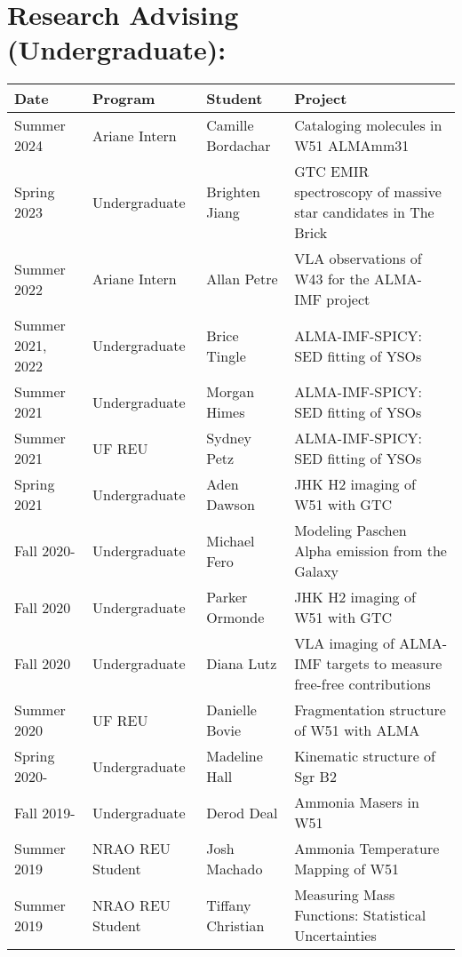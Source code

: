 \begin{minipage}{\textwidth}
\section*{Research Advising (Undergraduate): }
\vspace{-12pt}
\begin{tabular}{p{0.85in}p{1.3in}lp{2.6in}}
    Date  & Program & Student &  Project \\
    \hline
    Summer 2024 & Ariane Intern &          Camille Bordachar &  Cataloging molecules in W51 ALMAmm31 \\
    Spring 2023 & Undergraduate &          Brighten Jiang    &  GTC EMIR spectroscopy of massive star candidates in The Brick \\
    Summer 2022 & Ariane Intern &          Allan Petre    &  VLA observations of W43 for the ALMA-IMF project \\
    Summer 2021, 2022 & Undergraduate &    Brice Tingle    &  ALMA-IMF-SPICY: SED fitting of YSOs \\
    Summer 2021 & Undergraduate &          Morgan Himes    &  ALMA-IMF-SPICY: SED fitting of YSOs \\
    Summer 2021 & UF REU &                 Sydney Petz    &  ALMA-IMF-SPICY: SED fitting of YSOs \\
    Spring 2021 & Undergraduate &          Aden Dawson    &  JHK H2 imaging of W51 with GTC \\
    Fall 2020- & Undergraduate &           Michael Fero    &  Modeling Paschen Alpha emission from the Galaxy \\
    Fall 2020 & Undergraduate &            Parker Ormonde    &  JHK H2 imaging of W51 with GTC \\
    Fall 2020 & Undergraduate &            Diana Lutz    &  VLA imaging of ALMA-IMF targets to measure free-free contributions \\
    Summer 2020 & UF REU &                 Danielle Bovie    &  Fragmentation structure of W51 with ALMA \\
    Spring 2020- & Undergraduate &         Madeline Hall    &  Kinematic structure of Sgr B2 \\
    Fall 2019- & Undergraduate &           Derod Deal    &  Ammonia Masers in W51 \\
    Summer 2019 & NRAO REU Student &       Josh Machado    &  Ammonia Temperature Mapping of W51 \\
    Summer 2019 & NRAO REU Student &       Tiffany Christian    &  Measuring Mass Functions: Statistical Uncertainties \\

\end{tabular}
\end{minipage}
